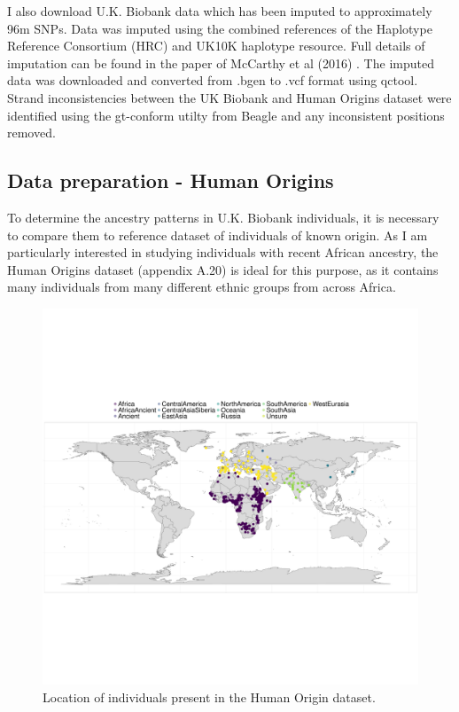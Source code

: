 I also download U.K. Biobank data which has been imputed to approximately 96m SNPs. Data was imputed using the combined references of the Haplotype Reference Consortium (HRC) and UK10K haplotype resource. Full details of imputation can be found in the paper of McCarthy et al (2016) \cite{mccarthy2016reference}. The imputed data was downloaded and converted from .bgen to .vcf format using qctool. Strand inconsistencies between the UK Biobank and Human Origins dataset were identified using the gt-conform utilty from Beagle and any inconsistent positions removed.

\subsection{Data preparation - Human Origins}

To determine the ancestry patterns in U.K. Biobank individuals, it is necessary to compare them to reference dataset of individuals of known origin. As I am particularly interested in studying individuals with recent African ancestry, the Human Origins dataset (appendix A.20) is ideal for this purpose, as it contains many individuals from many different ethnic groups from across Africa. 


\begin{figure}[htp]
    \centering
    \includegraphics[width=1.0\textwidth]{../images/chapter3/HumanOriginsMap.pdf}
    \caption{Location of individuals present in the Human Origin dataset.}
    \label{fig:PCA_chunklengths_HumanOrigins_UKBiobank}
\end{figure}

